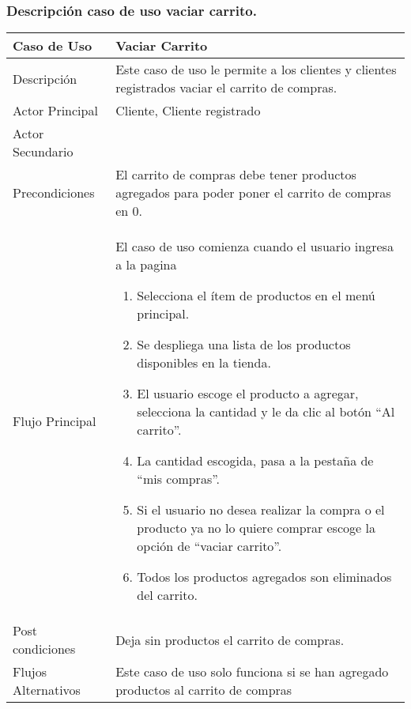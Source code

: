 \documentclass[12pt,a4paper]{article}
\begin{document}
    \newpage
    \subsubsection*{Descripción caso de uso vaciar carrito.}
    \begin{table}[h]
            \centering
            \begin{tabular}{| p{3cm}| p{11cm} |} 
            \hline  
            Caso de Uso         &    \textbf{ Vaciar Carrito}   \\ 
            \hline
            Descripción         &    Este caso de uso le permite a los clientes y clientes registrados vaciar el carrito de compras.   \\ 
            \hline
            Actor Principal     &    Cliente, Cliente registrado  \\ 
            \hline
            Actor Secundario    &       \\ 
            \hline
            Precondiciones      &    El carrito de compras debe tener productos agregados para poder poner el carrito de compras en 0. 	\\
            \hline
            Flujo Principal     &   El caso de uso comienza cuando el usuario ingresa a la pagina 
    
                \begin{enumerate}
                    \item Selecciona el ítem de productos en el menú principal.
                    \item Se despliega una lista de los productos disponibles en la tienda.
                    \item El usuario escoge el producto a agregar, selecciona la cantidad y le da clic al botón “Al carrito”.
                    \item La cantidad escogida, pasa a la pestaña de “mis compras”.
                    \item Si el usuario no desea realizar la compra o el producto ya no lo quiere comprar escoge la opción de “vaciar carrito”.
                    \item Todos los productos agregados son eliminados del carrito.
                \end{enumerate}
            \\  
            \hline
            Post condiciones    &    Deja sin productos el carrito de compras.   \\  
            \hline
            Flujos Alternativos &    Este caso de uso solo funciona si se han agregado productos al carrito de compras   \\  
            \hline
            \end{tabular}
        \end{table}
\end{document}
